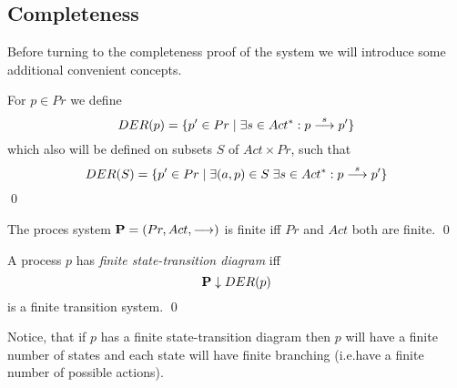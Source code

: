\subsection{Completeness}
Before turning to the completeness proof of the system we will introduce some additional convenient concepts.
\begin{definition}
For $p\in Pr$ we define
\[
DER(p) = \{p'\in Pr\mid \exists s\in Act^*:p\stackrel{s}{\longrightarrow}p'\}
\]
which also will be defined on subsets $S$ of $Act\times Pr$, such that
\[
DER(S) = \{p'\in Pr\mid \exists (a,p)\in S\;\exists s\in Act^*:p\stackrel{s}{\longrightarrow}p'\}
\]
\qed
\end{definition}
\begin{definition}
The proces system $\hbox{\bf P} = (Pr,Act,\stackrel{}{\longrightarrow})$ is finite iff $Pr$ and $Act$ both are finite.
\qed
\end{definition}
\begin{definition}
A process $p$ has {\em finite state-transition diagram\/} iff
\[
{\bf P}\downarrow DER(p)
\]
is a finite transition system.
\qed
\end{definition}
Notice, that if $p$ has a finite state-transition diagram then $p$ will have a finite number of states and each state will have finite branching (i.e.\@ have a finite number of possible actions).


